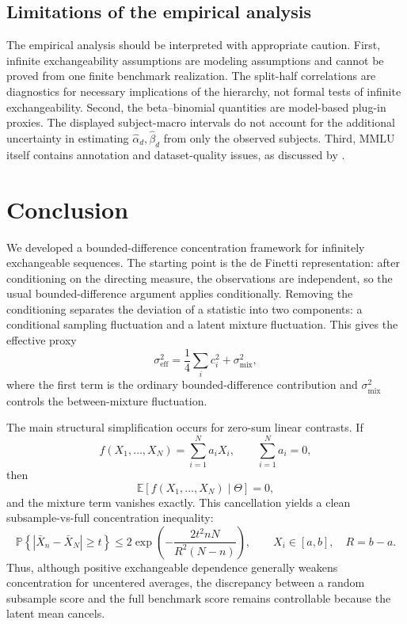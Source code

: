 \documentclass[11pt]{article}
\newcommand{\E}{\mathbb{E}}
\newcommand{\Pbb}{\mathbb{P}}
\theoremstyle{definition}
\theoremstyle{remark}
\begin{document}
\subsection{Limitations of the empirical analysis}

The empirical analysis should be interpreted with appropriate caution. First, infinite exchangeability assumptions are modeling assumptions and cannot be proved from one finite benchmark realization. The split-half correlations are diagnostics for necessary implications of the hierarchy, not formal tests of infinite exchangeability. Second, the beta--binomial quantities are model-based plug-in proxies. The displayed subject-macro intervals do not account for the additional uncertainty in estimating \(\hat\alpha_d,\hat\beta_d\) from only the observed subjects. Third, MMLU itself contains annotation and dataset-quality issues, as discussed by \citet{gema2025we}.

\section{Conclusion}\label{sec:conclusion}

We developed a bounded-difference concentration framework for infinitely
exchangeable sequences.  The starting point is the de Finetti representation:
after conditioning on the directing measure, the observations are independent,
so the usual bounded-difference argument applies conditionally.  Removing the
conditioning separates the deviation of a statistic into two components: a
conditional sampling fluctuation and a latent mixture fluctuation.  This gives
the effective proxy
\[
    \sigma_{\mathrm{eff}}^2
    =
    \frac14\sum_i c_i^2+\sigma_{\mathrm{mix}}^2,
\]
where the first term is the ordinary bounded-difference contribution and
\(\sigma_{\mathrm{mix}}^2\) controls the between-mixture fluctuation. 

The main structural simplification occurs for zero-sum linear contrasts.  If
\[
    f(X_1,\ldots,X_N)=\sum_{i=1}^N a_iX_i,
    \qquad
    \sum_{i=1}^N a_i=0,
\]
then
\[
    \E[f(X_1,\ldots,X_N)\mid\Theta]=0,
\]
and the mixture term vanishes exactly.  This cancellation yields a clean
subsample-vs-full concentration inequality:
\[
    \Pbb\left\{|\bar X_n-\bar X_N|\ge t\right\}
    \le
    2\exp\!\left(
        -\frac{2t^2 nN}{R^2(N-n)}
    \right),
    \qquad X_i\in[a,b], \quad R=b-a.
\]
Thus, although positive exchangeable dependence generally weakens
concentration for uncentered averages, the discrepancy between a random
subsample score and the full benchmark score remains controllable
because the latent mean cancels.
\end{document}
